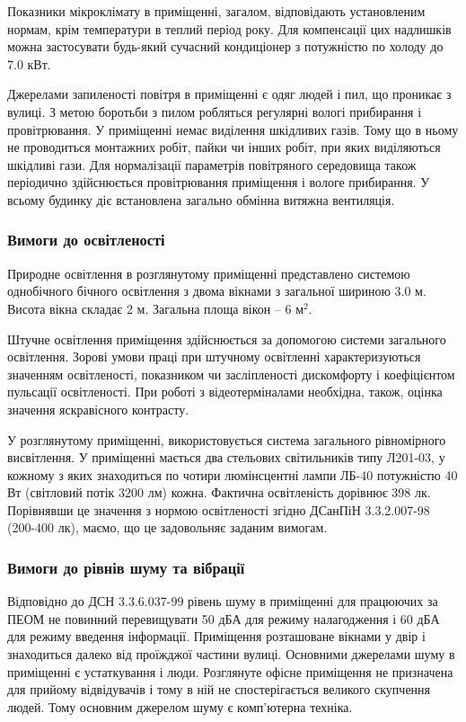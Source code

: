 Показники мікроклімату в приміщенні, загалом, відповідають установленим нормам, крім температури в теплий період року. Для компенсації цих надлишків можна застосувати будь-який сучасний кондиціонер з потужністю по холоду до 7.0 кВт.

Джерелами запиленості повітря в приміщенні є одяг людей і пил, що проникає з вулиці. З метою боротьби з пилом робляться регулярні вологі прибирання і провітрювання. У приміщенні немає виділення шкідливих газів. Тому що в ньому не проводиться монтажних робіт, пайки чи інших робіт, при яких виділяються шкідливі гази. Для нормалізації параметрів повітряного середовища також періодично здійснюється провітрювання приміщення і вологе прибирання. У всьому будинку діє встановлена загально обмінна витяжна вентиляція.

\subsubsection{Вимоги до освітленості}

Природне освітлення в розглянутому приміщенні представлено системою однобічного бічного освітлення з двома вікнами з загальної  шириною 3.0 м. Висота вікна складає 2 м. Загальна площа вікон – 6 $\text{м}^2$.

Штучне освітлення приміщення здійснюється за допомогою системи загального освітлення. Зорові умови праці при штучному освітленні характеризуються значенням освітленості, показником чи засліпленості дискомфорту і коефіцієнтом пульсації освітленості. При роботі з відеотерміналами необхідна, також, оцінка значення яскравісного контрасту.

У розглянутому приміщенні, використовується система загального рівномірного висвітлення. У приміщенні мається два стельових світильників типу Л201-03, у кожному з яких знаходиться по чотири люмінсцентні лампи ЛБ-40 потужністю 40 Вт (світловий потік 3200 лм) кожна.
Фактична освітленість дорівнює 398 лк. Порівнявши це значення з нормою освітленості згідно ДСанПіН 3.3.2.007-98 (200-400 лк), маємо, що це задовольняє заданим вимогам.

\subsubsection{Вимоги до рівнів шуму та вібрації}

Відповідно до ДСН 3.3.6.037-99 рівень шуму в приміщенні для працюючих за ПЕОМ не повинний перевищувати 50 дБА для режиму налагодження і 60 дБА для режиму введення інформації.
Приміщення розташоване вікнами у двір і знаходиться далеко від проїжджої частини вулиці. Основними джерелами шуму в приміщенні є устаткування і люди. Розглянуте офісне приміщення не призначена для прийому відвідувачів і тому в ній не спостерігається великого скупчення людей. Тому основним джерелом шуму є комп'ютерна техніка.

